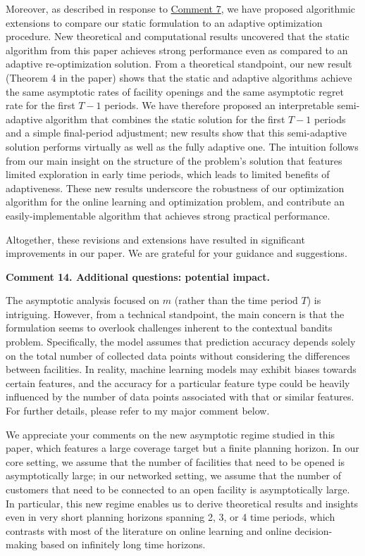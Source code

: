 \documentclass[11pt]{article}
\begin{document}
Moreover, as described in response to \hyperref[R2:7]{\color{blue}Comment 7}, we have proposed algorithmic extensions to compare our static formulation to an adaptive optimization procedure. New theoretical and computational results uncovered that the static algorithm from this paper achieves strong performance even as compared to an adaptive re-optimization solution. From a theoretical standpoint, our new result (Theorem 4 in the paper) shows that the static and adaptive algorithms achieve the same asymptotic rates of facility openings and the same asymptotic regret rate for the first $T-1$ periods. We have therefore proposed an interpretable semi-adaptive algorithm that combines the static solution for the first $T-1$ periods and a simple final-period adjustment; new results show that this semi-adaptive solution performs virtually as well as the fully adaptive one. The intuition follows from our main insight on the structure of the problem's solution that features limited exploration in early time periods, which leads to limited benefits of adaptiveness. These new results underscore the robustness of our optimization algorithm for the online learning and optimization problem, and contribute an easily-implementable algorithm that achieves strong practical performance.

Altogether, these revisions and extensions have resulted in significant improvements in our paper. We are grateful for your guidance and suggestions.

\begin{commentBox}
    \textbf{Comment 14. Additional questions: potential impact.}\label{R2:14}

    The asymptotic analysis focused on $m$ (rather than the time period $T$) is intriguing. However, from a technical standpoint, the main concern is that the formulation seems to overlook challenges inherent to the contextual bandits problem. Specifically, the model assumes that prediction accuracy depends solely on the total number of collected data points without considering the differences between facilities. In reality, machine learning models may exhibit biases towards certain features, and the accuracy for a particular feature type could be heavily influenced by the number of data points associated with that or similar features. For further details, please refer to my major comment below.
\end{commentBox}

We appreciate your comments on the new asymptotic regime studied in this paper, which features a large coverage target but a finite planning horizon. In our core setting, we assume that the number of facilities that need to be opened is asymptotically large; in our networked setting, we assume that the number of customers that need to be connected to an open facility is asymptotically large. In particular, this new regime enables us to derive theoretical results and insights even in very short planning horizons spanning 2, 3, or 4 time periods, which contrasts with most of the literature on online learning and online decision-making based on infinitely long time horizons. 
\end{document}
